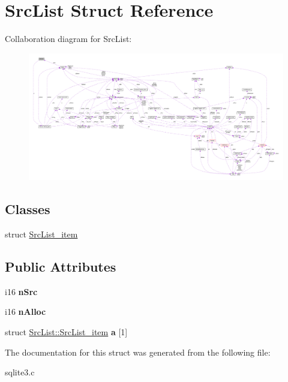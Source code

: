 \hypertarget{struct_src_list}{\section{Src\-List Struct Reference}
\label{struct_src_list}
}


Collaboration diagram for Src\-List\-:\nopagebreak
\begin{figure}[H]
\begin{center}
\leavevmode
\includegraphics[width=350pt]{struct_src_list__coll__graph}
\end{center}
\end{figure}
\subsection*{Classes}
\begin{DoxyCompactItemize}
\item 
struct \hyperlink{struct_src_list_1_1_src_list__item}{Src\-List\-\_\-item}
\end{DoxyCompactItemize}
\subsection*{Public Attributes}
\begin{DoxyCompactItemize}
\item 
\hypertarget{struct_src_list_a99c1d923c49fc0598d92f1cb54958ef4}{i16 {\bfseries n\-Src}}\label{struct_src_list_a99c1d923c49fc0598d92f1cb54958ef4}

\item 
\hypertarget{struct_src_list_aae88b994b131fea8c733aa609bae7e6e}{i16 {\bfseries n\-Alloc}}\label{struct_src_list_aae88b994b131fea8c733aa609bae7e6e}

\item 
\hypertarget{struct_src_list_acd181938f7144b40022b28072247aa3d}{struct \hyperlink{struct_src_list_1_1_src_list__item}{Src\-List\-::\-Src\-List\-\_\-item} {\bfseries a} \mbox{[}1\mbox{]}}\label{struct_src_list_acd181938f7144b40022b28072247aa3d}

\end{DoxyCompactItemize}


The documentation for this struct was generated from the following file\-:\begin{DoxyCompactItemize}
\item 
sqlite3.\-c\end{DoxyCompactItemize}
